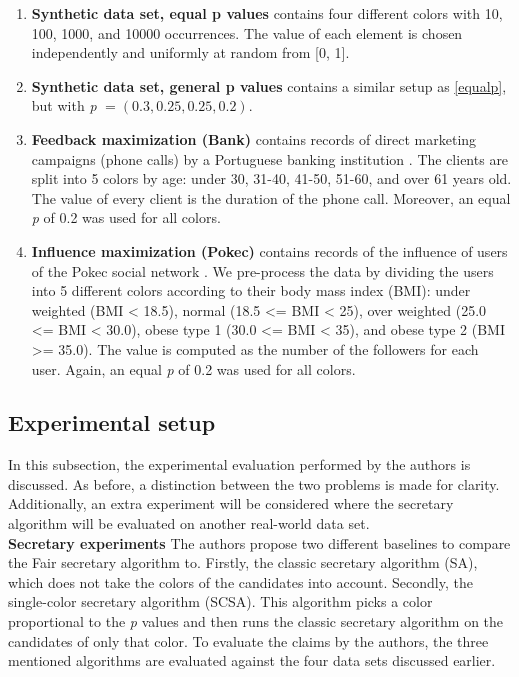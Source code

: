 \begin{enumerate}
    \item \textbf{Synthetic data set, equal p values} contains four different colors with 10, 100, 1000, and 10000 occurrences. The value of each element is chosen independently and uniformly at random from [0, 1]. \label{equalp}
    \item \textbf{Synthetic data set, general p values} contains a similar setup as \ref{equalp}, but with \textit{p} $= (0.3, 0.25, 0.25, 0.2)$.
    \item \textbf{Feedback maximization (Bank)} contains records of direct marketing campaigns (phone calls) by a Portuguese banking institution \citep{bankport}. The clients are split into 5 colors by age: under 30, 31-40, 41-50, 51-60, and over 61 years old. The value of every client is the duration of the phone call. Moreover, an equal \textit{p} of 0.2 was used for all colors.

    \item \textbf{Influence maximization (Pokec)} contains records of the influence of users of the Pokec social network \citep{pokec}. We pre-process the data by dividing the users into 5 different colors according to their body mass index (BMI): under weighted (BMI < 18.5), normal (18.5 <= BMI < 25), over weighted (25.0 <= BMI < 30.0), obese type 1 (30.0 <= BMI < 35), and obese type 2 (BMI >= 35.0). The value is computed as the number of the followers for each user. Again, an equal \textit{p} of 0.2 was used for all colors.
    \end{enumerate}

\subsection{Experimental setup}
\label{experimental_setup}
In this subsection, the experimental evaluation performed by the authors is discussed. As before, a distinction between the two problems is made for clarity. Additionally, an extra experiment will be considered where the secretary algorithm will be evaluated on another real-world data set. \\
\textbf{Secretary experiments}
\FloatBarrier
\label{Secretary_Experiments}
The authors propose two different baselines to compare the Fair secretary algorithm to. Firstly, the classic secretary algorithm (SA), which does not take the colors of the candidates into account. Secondly, the single-color secretary algorithm (SCSA). This algorithm picks a color proportional to the \textit{p} values and then runs the classic secretary algorithm on the candidates of only that color. To evaluate the claims by the authors, the three mentioned algorithms are evaluated against the four data sets discussed earlier.

